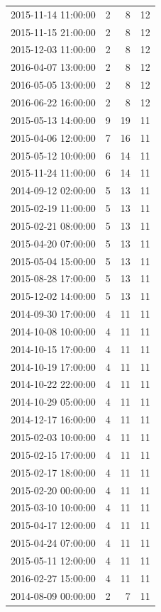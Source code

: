 \begin{tabular}{lrrr}
2015-11-14 11:00:00 & 2 & 8 & 12 \\
2015-11-15 21:00:00 & 2 & 8 & 12 \\
2015-12-03 11:00:00 & 2 & 8 & 12 \\
2016-04-07 13:00:00 & 2 & 8 & 12 \\
2016-05-05 13:00:00 & 2 & 8 & 12 \\
2016-06-22 16:00:00 & 2 & 8 & 12 \\
2015-05-13 14:00:00 & 9 & 19 & 11 \\
2015-04-06 12:00:00 & 7 & 16 & 11 \\
2015-05-12 10:00:00 & 6 & 14 & 11 \\
2015-11-24 11:00:00 & 6 & 14 & 11 \\
2014-09-12 02:00:00 & 5 & 13 & 11 \\
2015-02-19 11:00:00 & 5 & 13 & 11 \\
2015-02-21 08:00:00 & 5 & 13 & 11 \\
2015-04-20 07:00:00 & 5 & 13 & 11 \\
2015-05-04 15:00:00 & 5 & 13 & 11 \\
2015-08-28 17:00:00 & 5 & 13 & 11 \\
2015-12-02 14:00:00 & 5 & 13 & 11 \\
2014-09-30 17:00:00 & 4 & 11 & 11 \\
2014-10-08 10:00:00 & 4 & 11 & 11 \\
2014-10-15 17:00:00 & 4 & 11 & 11 \\
2014-10-19 17:00:00 & 4 & 11 & 11 \\
2014-10-22 22:00:00 & 4 & 11 & 11 \\
2014-10-29 05:00:00 & 4 & 11 & 11 \\
2014-12-17 16:00:00 & 4 & 11 & 11 \\
2015-02-03 10:00:00 & 4 & 11 & 11 \\
2015-02-15 17:00:00 & 4 & 11 & 11 \\
2015-02-17 18:00:00 & 4 & 11 & 11 \\
2015-02-20 00:00:00 & 4 & 11 & 11 \\
2015-03-10 10:00:00 & 4 & 11 & 11 \\
2015-04-17 12:00:00 & 4 & 11 & 11 \\
2015-04-24 07:00:00 & 4 & 11 & 11 \\
2015-05-11 12:00:00 & 4 & 11 & 11 \\
2016-02-27 15:00:00 & 4 & 11 & 11 \\
2014-08-09 00:00:00 & 2 & 7 & 11 \\

\end{tabular}

